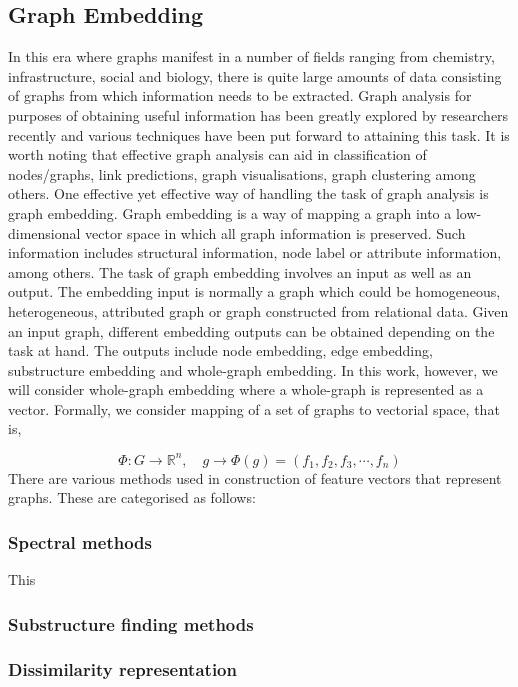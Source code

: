 \documentclass[10pt,a4paper]{article}
\begin{document}
     \subsection{Graph Embedding}
     In this era where graphs manifest in a number of fields ranging from chemistry, infrastructure, social and biology,  there is quite large amounts of data consisting of graphs from which information needs to be extracted. Graph analysis for purposes of obtaining useful information has been greatly explored by researchers recently and various techniques have been put forward to attaining this task. It is worth noting that effective graph analysis can aid in classification of nodes/graphs, link predictions, graph visualisations, graph clustering among others.
     One effective yet effective way of handling the task of graph analysis is graph embedding. Graph embedding is a way of mapping a graph into a low-dimensional vector space in which all graph information is preserved. Such information includes structural information, node label or attribute information, among others. 
     The task of graph embedding involves an input as well as an output. The embedding input is normally a graph which could be homogeneous, heterogeneous, attributed graph or graph constructed from relational data. Given an input graph, different embedding outputs can be obtained depending on the task at hand. The outputs include node embedding, edge embedding, substructure embedding and whole-graph embedding. In this work, however, we will consider whole-graph embedding where a whole-graph is represented as a vector.  Formally, we consider mapping of a set of graphs to vectorial space, that is,
     
     \begin{equation}
     \Phi : G \longrightarrow \mathbb{R}^n, \quad 
     g \longrightarrow \Phi(g) = (f_1, f_2, f_3, \cdots, f_n)
     \end{equation}     
     There are various methods used in construction of feature vectors that represent graphs. These are categorised as follows:
     \subsubsection{Spectral methods}
     This 
     \subsubsection{Substructure finding methods}
     \subsubsection{Dissimilarity representation}
     
\end{document}
